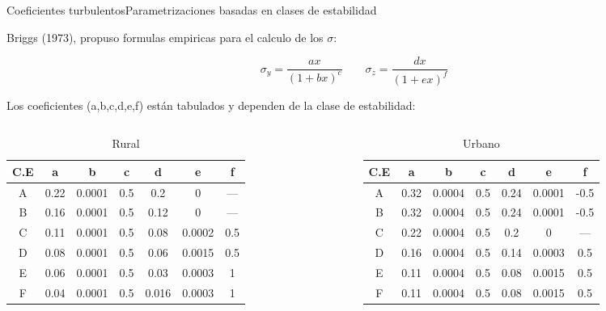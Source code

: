  \begin{frame}{Coeficientes turbulentos}{Parametrizaciones basadas en clases de estabilidad}
  
 Briggs (1973), propuso formulas empiricas para el calculo de los $\sigma$:
  
 $$
 \sigma_y =\dfrac{a x}{(1+bx)^c}
 \qquad
 \sigma_z =\dfrac{d x}{(1+ex)^f}
 $$
  
 Los coeficientes (a,b,c,d,e,f) están tabulados y dependen de la clase de estabilidad:
  
{\tiny
 \begin{columns}[t]

 
 \begin{table}
     \centering
 \begin{tabular}{| c | c c  c | c c c |}
 \hline
 C.E&    a &    b   &    c &     d &   e    & f  \\\hline
  A & 0.22 & 0.0001 &  0.5 & 0.2   & 0      & —  \\     
  B & 0.16 & 0.0001 &  0.5 & 0.12  & 0      & —  \\
  C & 0.11 & 0.0001 &  0.5 & 0.08  & 0.0002 & 0.5\\
  D & 0.08 & 0.0001 &  0.5 & 0.06  & 0.0015 & 0.5\\
  E & 0.06 & 0.0001 &  0.5 & 0.03  & 0.0003 & 1  \\
  F & 0.04 & 0.0001 &  0.5 & 0.016 & 0.0003 & 1  \\ \hline
 \end{tabular}
     \caption{Rural}
 \end{table}
  
 
 \begin{table}
     \centering
 \begin{tabular}{| c | c c  c | c c c |}
 \hline
 C.E& a & b & c & d & e & f  \\\hline
 A   & 0.32 & 0.0004 & 0.5 & 0.24  & 0.0001  & -0.5 \\
 B   & 0.32 & 0.0004 & 0.5 & 0.24  & 0.0001  & -0.5 \\
 C   & 0.22 & 0.0004 & 0.5 & 0.2   & 0       & —    \\
 D   & 0.16 & 0.0004 & 0.5 & 0.14  & 0.0003  & 0.5  \\
 E   & 0.11 & 0.0004 & 0.5 & 0.08  & 0.0015  & 0.5  \\ 
 F   & 0.11 & 0.0004 & 0.5 & 0.08  & 0.0015  & 0.5  \\ \hline
 \end{tabular}
     \caption{Urbano}
 \end{table}
 \end{columns}
 } %
 \end{frame}
